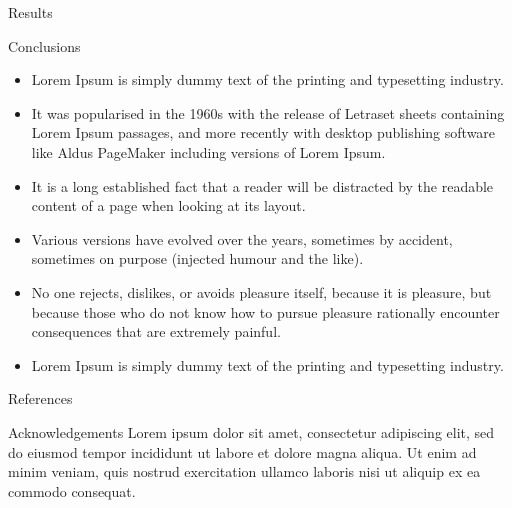 \documentclass[20pt]{beamer}
\begin{document}
\begin{frame}[t]
\begin{columns}[t]
\begin{column}{0.32\linewidth}
\begin{block}{Results}
\end{block}		

\begin{block}{Conclusions}
\begin{itemize}
	\item  Lorem Ipsum is simply dummy text of the printing and typesetting industry.
	
	\item   It was popularised in the 1960s with the release of Letraset sheets containing Lorem Ipsum passages, and more recently with desktop publishing software like Aldus PageMaker including versions of Lorem Ipsum.
	
	\item  It is a long established fact that a reader will be distracted by the readable content of a page when looking at its layout. 
	
	\item  Various versions have evolved over the years, sometimes by accident, sometimes on purpose (injected humour and the like).
	
	\item No one rejects, dislikes, or avoids pleasure itself, because it is pleasure, but because those who do not know how to pursue pleasure rationally encounter consequences that are extremely painful. 
	
	\item Lorem Ipsum is simply dummy text of the printing and typesetting industry.	
\end{itemize}		
\end{block}	

\begin{block}{References}

	
	
\end{block}	

\begin{block}{Acknowledgements}
Lorem ipsum dolor sit amet, consectetur adipiscing
elit, sed do eiusmod tempor incididunt ut labore et
dolore magna aliqua. Ut enim ad minim veniam, quis
nostrud exercitation ullamco laboris nisi ut aliquip ex
ea commodo consequat.	

\vspace{1.5cm}	
\end{block}		
\end{column}	
		
\end{columns}	  
\end{frame}
\end{document}
